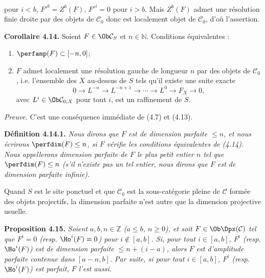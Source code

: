 pour \(i<b\), \(F'^b=Z^b(F)\), \(F'^i=0\) pour \(i>b\). Mais \(Z^b(F)\) admet une résolution finie droite par des objets de \(\mathcal C_0\) donc est localement objet de \(\mathcal C_0\), d'où l'assertion.

\textbf{Corollaire 4.14.} Soient \(F\in\Ob\mathcal C_S\) et \(n\in\mathbb N\). Conditions équivalentes :
\begin{enumerate}[label=(\roman*)]
\item \(\perfamp(F)\subset[-n,0]\);
\item \(F\) admet localement une résolution gauche de longueur \(n\) par des objets de \(\mathcal C_0\), i.e. l'ensemble des \(X\) au-dessus de \(S\) tels qu'il existe une suite exacte
\[
  0\longrightarrow L^{-n}\longrightarrow L^{-n+1}\longrightarrow \cdots
  \longrightarrow L^0\longrightarrow F_X\longrightarrow 0,
\]
avec \(L^i\in\Ob\mathcal C_{0,X}\) pour tout \(i\), est un raffinement de \(S\).
\end{enumerate}

\emph{Preuve.} C'est une conséquence immédiate de (4.7) et (4.13).

\textbf{Définition 4.14.1.} \emph{Nous dirons que \(F\) est de dimension parfaite \(\leq n\), et nous écrirons \(\perfdim(F)\leq n\), si \(F\) vérifie les conditions équivalentes de (4.14). Nous appellerons dimension parfaite de \(F\) le plus petit entier \(n\) tel que \(\perfdim(F)\leq n\) (s'il n'existe pas un tel entier, nous dirons que \(F\) est de dimension parfaite infinie).}

Quand \(S\) est le site ponctuel et que \(\mathcal C_0\) est la sous-catégorie pleine de \(\mathcal C\) formée des objets projectifs, la dimension parfaite n'est autre que la dimension projective usuelle.

\textbf{Proposition 4.15.} \emph{Soient \(a,b,n\in\mathbb Z\) (\(a\leq b\), \(n\geq0\)), et soit \(F\in\Ob\Dpx(\mathcal C)\) tel que \(F^i=0\) (resp. \(\Ho^i(F)=0\)) pour \(i\notin[a,b]\). Si, pour tout \(i\in[a,b]\), \(F^i\) (resp. \(\Ho^i(F)\)) est de dimension parfaite \(\leq n+(i-a)\), alors \(F\) est d'amplitude parfaite contenue dans \([a-n,b]\). Par suite, si pour tout \(i\in[a,b]\), \(F^i\) (resp. \(\Ho^i(F)\)) est parfait, \(F\) l'est aussi.}

